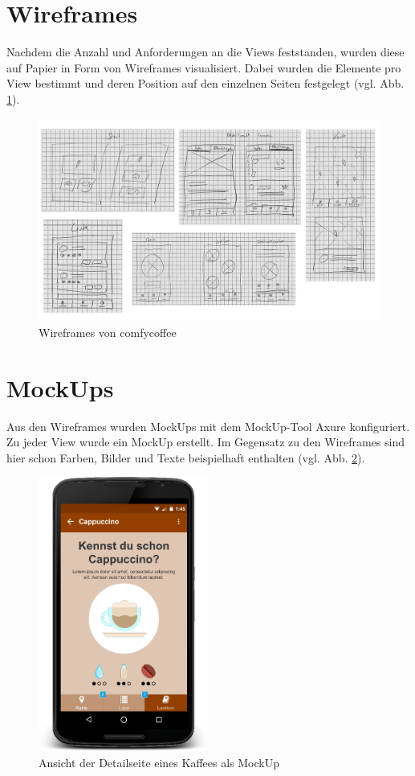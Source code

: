 \newpage

\section{Wireframes}
Nachdem die Anzahl und Anforderungen an die Views feststanden, wurden diese auf Papier in Form von Wireframes visualisiert. Dabei wurden die Elemente pro View bestimmt und deren Position auf den einzelnen Seiten festgelegt (vgl. Abb. \ref{fig:wireframes}).

\begin{figure}[h!]
    \centering
		\includegraphics[width=\textwidth]{Bilder/wireframes.png}
		\caption{Wireframes von comfycoffee}
		\label{fig:wireframes}
\end{figure}

\newpage
\section{MockUps}
Aus den Wireframes wurden MockUps mit dem MockUp-Tool Axure konfiguriert. Zu jeder View wurde ein MockUp erstellt. Im Gegensatz zu den Wireframes sind hier schon Farben, Bilder und Texte beispielhaft enthalten (vgl. Abb. \ref{fig:mockup}).\newline

\begin{figure}[h!]
    \centering
		\includegraphics[width=0.5\textwidth]{Bilder/detail.png}
		\caption{Ansicht der Detailseite eines Kaffees als MockUp}
		\label{fig:mockup}
\end{figure}


